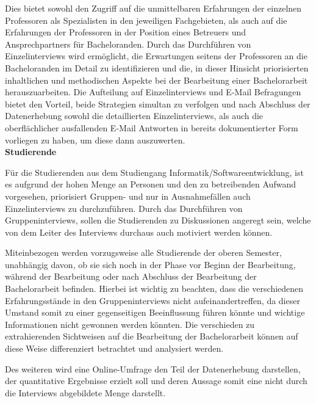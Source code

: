 \documentclass{scrreprt}
\begin{document}
\par Dies bietet sowohl den Zugriff auf die unmittelbaren Erfahrungen der einzelnen Professoren als Spezialisten in den jeweiligen Fachgebieten, als auch auf die Erfahrungen der Professoren in der Position eines Betreuers und Ansprechpartners für Bacheloranden. Durch das Durchführen von Einzelinterviews wird ermöglicht, die Erwartungen seitens der Professoren an die Bacheloranden im Detail zu identifizieren und die, in dieser Hinsicht priorisierten inhaltlichen und methodischen Aspekte bei der Bearbeitung einer Bachelorarbeit herauszuarbeiten. Die Aufteilung auf Einzelinterviews und E-Mail Befragungen bietet den Vorteil, beide Strategien simultan zu verfolgen und nach Abschluss der Datenerhebung sowohl die detaillierten Einzelinterviews, als auch die oberflächlicher ausfallenden E-Mail Antworten in bereits dokumentierter Form vorliegen zu haben, um diese dann auszuwerten.\\

\textbf{Studierende}
\par Für die Studierenden aus dem Studiengang Informatik/Softwareentwicklung, ist es aufgrund der hohen Menge an Personen und den zu betreibenden Aufwand vorgesehen, priorisiert Gruppen- und nur in Ausnahmefällen auch Einzelinterviews zu durchzuführen. 
Durch das Durchführen von Gruppeninterviews, sollen die Studierenden zu Diskussionen angeregt sein, welche von dem Leiter des Interviews durchaus auch motiviert werden können.
\par Miteinbezogen werden vorzugsweise alle Studierende der oberen Semester, unabhängig davon, ob sie sich noch in der Phase vor Beginn der Bearbeitung, während der Bearbeitung oder nach Abschluss der Bearbeitung der Bachelorarbeit befinden. Hierbei ist wichtig zu beachten, dass die verschiedenen Erfahrungsstände in den Gruppeninterviews nicht aufeinandertreffen, da dieser Umstand somit zu einer gegenseitigen Beeinflussung führen könnte und wichtige Informationen nicht gewonnen werden könnten. Die verschieden zu extrahierenden Sichtweisen auf die Bearbeitung der Bachelorarbeit können auf diese Weise differenziert betrachtet und analysiert werden.
\par Des weiteren wird eine Online-Umfrage den Teil der Datenerhebung darstellen, der quantitative Ergebnisse erzielt soll und deren Aussage somit eine nicht durch die Interviews abgebildete Menge darstellt.
\end{document}
